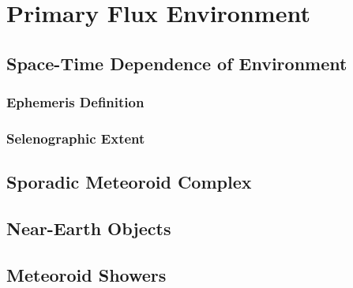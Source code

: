 \documentclass{article}
\begin{document}
\section{Primary Flux Environment}



\subsection{Space-Time Dependence of Environment}


\subsubsection{Ephemeris Definition}


\subsubsection{Selenographic Extent}


\subsection{Sporadic Meteoroid Complex}
	
\subsection{Near-Earth Objects}

\subsection{Meteoroid Showers}

	
\end{document}
